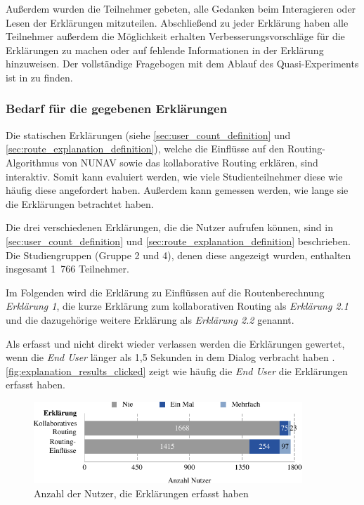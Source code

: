 Außerdem wurden die Teilnehmer gebeten, alle Gedanken beim Interagieren oder Lesen der Erklärungen mitzuteilen. Abschließend zu jeder Erklärung haben alle Teilnehmer außerdem die Möglichkeit erhalten Verbesserungsvorschläge für die Erklärungen zu machen oder auf fehlende Informationen in der Erklärung hinzuweisen. Der vollständige Fragebogen mit dem Ablauf des Quasi-Experiments ist in  zu finden.

\subsubsection{Bedarf für die gegebenen Erklärungen}

Die statischen Erklärungen (siehe \autoref{sec:user_count_definition} und \autoref{sec:route_explanation_definition}), welche die Einflüsse auf den Routing-Algorithmus von NUNAV sowie das kollaborative Routing erklären, sind interaktiv. Somit kann evaluiert werden, wie viele Studienteilnehmer diese wie häufig diese angefordert haben. Außerdem kann gemessen werden, wie lange sie die Erklärungen betrachtet haben.

Die drei verschiedenen Erklärungen, die die Nutzer aufrufen können, sind in \autoref{sec:user_count_definition} und \autoref{sec:route_explanation_definition} beschrieben. Die Studiengruppen (Gruppe 2 und 4), denen diese angezeigt wurden, enthalten insgesamt 1~766 Teilnehmer.

Im Folgenden wird die Erklärung zu Einflüssen auf die Routenberechnung \textit{Erklärung 1}, die kurze Erklärung zum kollaborativen Routing als \textit{Erklärung 2.1} und die dazugehörige weitere Erklärung als \textit{Erklärung 2.2} genannt.

Als erfasst und nicht direkt wieder verlassen werden die Erklärungen gewertet, wenn die \textit{End User} länger als 1,5 Sekunden in dem Dialog verbracht haben \cite{BAHR2011776}. \autoref{fig:explanation_results_clicked} zeigt wie häufig die \textit{End User} die Erklärungen erfasst haben. 

\begin{figure}[htb!]
    \centering
    \includegraphics[width=0.9\textwidth]{contents/06_model_evaluation/02_evaluation/res/explanation_results_clicked.pdf}
    \caption{Anzahl der Nutzer, die Erklärungen erfasst haben}
    \label{fig:explanation_results_clicked}
\end{figure}

